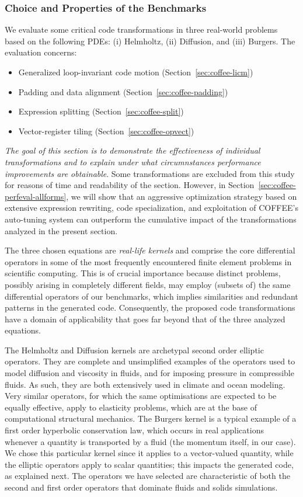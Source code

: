 \subsubsection{Choice and Properties of the Benchmarks}
\label{sec:real-examples}
We evaluate some critical code transformations in three real-world problems based on the following PDEs: (i) Helmholtz, (ii) Diffusion, and (iii) Burgers. The evaluation concerns:
\begin{itemize}
\item Generalized loop-invariant code motion (Section~\ref{sec:coffee-licm})
\item Padding and data alignment (Section~\ref{sec:coffee-padding})
\item Expression splitting (Section~\ref{sec:coffee-split})
\item Vector-register tiling (Section~\ref{sec:coffee-opvect})
\end{itemize}
\textit{The goal of this section is to demonstrate the effectiveness of individual transformations and to explain under what circumnstances performance improvements are obtainable}. Some transformations are excluded from this study for reasons of time and readability of the section. However, in Section~\ref{sec:coffee-perfeval-allforms}, we will show that an aggressive optimization strategy based on extensive expression rewriting, code specialization, and exploitation of COFFEE's auto-tuning system can outperform the cumulative impact of the transformations analyzed in the present section.

The three chosen equations are \emph{real-life kernels} and comprise the core differential operators in some of the most frequently encountered finite element problems in scientific computing. This is of crucial importance because distinct problems, possibly arising in completely different fields, may employ (subsets of) the same differential operators of our benchmarks, which implies similarities and redundant patterns in the generated code. Consequently, the proposed code transformations have a domain of applicability that goes far beyond that of the three analyzed equations.

The Helmholtz and Diffusion kernels are archetypal second order elliptic operators. They are complete and unsimplified examples of the operators used to model diffusion and viscosity in fluids, and for imposing pressure in compressible fluids. As such, they are both extensively used in climate and ocean modeling. Very similar operators, for which the same optimisations are expected to be equally effective, apply to elasticity problems, which are at the base of computational structural mechanics. The Burgers kernel is a typical example of a first order hyperbolic conservation law, which occurs in real applications whenever a quantity is transported by a fluid (the momentum itself, in our case). We chose this particular kernel since it applies to a vector-valued quantity, while the elliptic operators apply to scalar quantities; this impacts the generated code, as explained next. The operators we have selected are characteristic of both the second and first order operators that dominate fluids and solids simulations.

